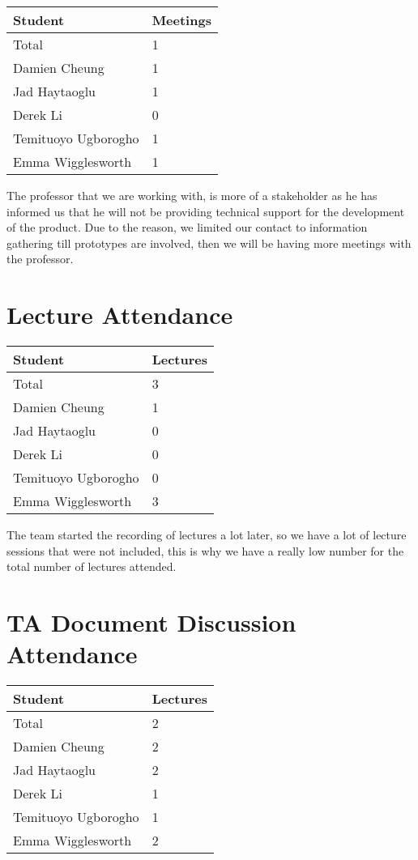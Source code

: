 \documentclass{article}
\begin{document}
\begin{table}[H]
\centering
\begin{tabular}{ll}
\toprule
\textbf{Student} & \textbf{Meetings}\\
\midrule
Total & 1\\
Damien Cheung & 1\\
Jad Haytaoglu & 1\\
Derek Li & 0\\
Temituoyo Ugborogho & 1\\
Emma Wigglesworth & 1\\
\bottomrule
\end{tabular}
\end{table}

The professor that we are working with, is more of a stakeholder as he has informed
us that he will not be providing technical support for the development of the product.
Due to the reason, we limited our contact to information gathering till prototypes are
involved, then we will be having more meetings with the professor.

\section{Lecture Attendance}

\begin{table}[H]
\centering
\begin{tabular}{ll}
\toprule
\textbf{Student} & \textbf{Lectures}\\
\midrule
Total & 3\\
Damien Cheung & 1\\
Jad Haytaoglu & 0\\
Derek Li & 0\\
Temituoyo Ugborogho & 0\\
Emma Wigglesworth & 3\\
\bottomrule
\end{tabular}
\end{table}

The team started the recording of lectures a lot later, so we have a lot of lecture sessions
that were not included, this is why we have a really low number for the total number of 
lectures attended.

\section{TA Document Discussion Attendance}

\begin{table}[H]
\centering
\begin{tabular}{ll}
\toprule
\textbf{Student} & \textbf{Lectures}\\
\midrule
Total & 2\\
Damien Cheung & 2\\
Jad Haytaoglu & 2\\
Derek Li & 1\\
Temituoyo Ugborogho & 1\\
Emma Wigglesworth & 2\\
\bottomrule
\end{tabular}
\end{table}
\end{document}
